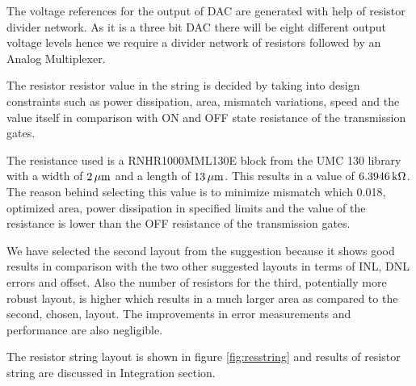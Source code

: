 \documentclass[parskip,oneside,colorbacktitle,10pt,accentcolor=tud1b,table]{tudreport}
\begin{document}
{The voltage references for the output of DAC are generated with help of resistor divider network. As it is a three bit DAC there will be eight different output voltage levels hence we require a divider network of resistors followed by an Analog Multiplexer. 

The resistor resistor value in the string is decided by taking into design constraints such as power dissipation, area, mismatch variations, speed and the value itself in comparison with ON and OFF state resistance of the transmission gates. 

The resistance used is a RNHR1000MML130E block from the UMC 130 library with a width of $\unit[2]{\mu m}$ and a length of $\unit[13]{\mu m}$. This results in a value of $\unit[6.3946]{k\Omega}$. The reason behind selecting this value is to minimize mismatch which 0.018, optimized area, power dissipation in specified limits and the value of the resistance is lower than the OFF resistance of the transmission gates. 

We have selected the second layout from the suggestion because it shows good results in comparison with the two other suggested layouts in terms of INL, DNL errors and offset. Also the number of resistors for the third, potentially more robust layout, is higher which results in a much larger area as compared to the second, chosen, layout. The improvements in error measurements and performance are also negligible. 

The resistor string layout is shown in figure \ref{fig:resstring} and results of resistor string are discussed in Integration section.

}
\end{document}
